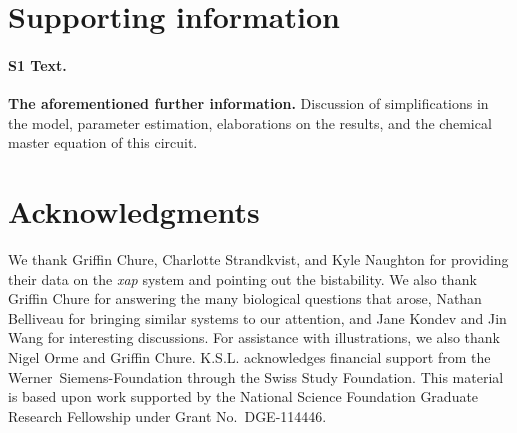 \documentclass[10pt,letterpaper]{article}
\begin{document}
	
	\section*{Supporting information}
	\paragraph*{S1 Text.}
	\label{S1_Text}
	{\bf The aforementioned further information.} Discussion of simplifications
	in the model, parameter estimation, elaborations on the results, and the
	chemical master equation of this circuit.
	
	\section*{Acknowledgments}
	We thank Griffin Chure, Charlotte Strandkvist, and Kyle Naughton for
	providing their data on the \emph{xap} system and pointing out the
	bistability. We also thank Griffin Chure for answering the many biological
	questions that arose, Nathan Belliveau for bringing similar systems to our
	attention, and Jane Kondev and Jin Wang for interesting discussions.
	For assistance with illustrations, we also thank Nigel Orme and Griffin Chure.
	K.S.L. acknowledges financial support from the
	Werner~Siemens-Foundation through the Swiss Study Foundation.
	This material is based upon work supported by the National Science Foundation
	Graduate Research Fellowship under Grant No.\ DGE-114446.
	
	\nolinenumbers
	
	
\end{document}
